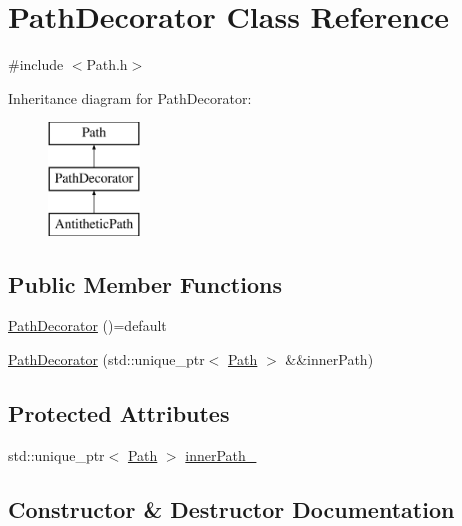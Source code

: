 \hypertarget{class_path_decorator}{}\section{Path\+Decorator Class Reference}
\label{class_path_decorator}


{\ttfamily \#include $<$Path.\+h$>$}

Inheritance diagram for Path\+Decorator\+:\begin{figure}[H]
\begin{center}
\leavevmode
\includegraphics[height=3.000000cm]{class_path_decorator}
\end{center}
\end{figure}
\subsection*{Public Member Functions}
\begin{DoxyCompactItemize}
\item 
\hyperlink{class_path_decorator_a11d7b37b1c60bc36e26609ff96e0e329}{Path\+Decorator} ()=default
\item 
\hyperlink{class_path_decorator_a26a8109e1d038f59140a243f1ceb6084}{Path\+Decorator} (std\+::unique\+\_\+ptr$<$ \hyperlink{class_path}{Path} $>$ \&\&inner\+Path)
\end{DoxyCompactItemize}
\subsection*{Protected Attributes}
\begin{DoxyCompactItemize}
\item 
std\+::unique\+\_\+ptr$<$ \hyperlink{class_path}{Path} $>$ \hyperlink{class_path_decorator_a91f1257f216052a32b4ea78feb9d0755}{inner\+Path\+\_\+}
\end{DoxyCompactItemize}


\subsection{Constructor \& Destructor Documentation}
\hypertarget{class_path_decorator_a11d7b37b1c60bc36e26609ff96e0e329}{}\label{class_path_decorator_a11d7b37b1c60bc36e26609ff96e0e329} 
